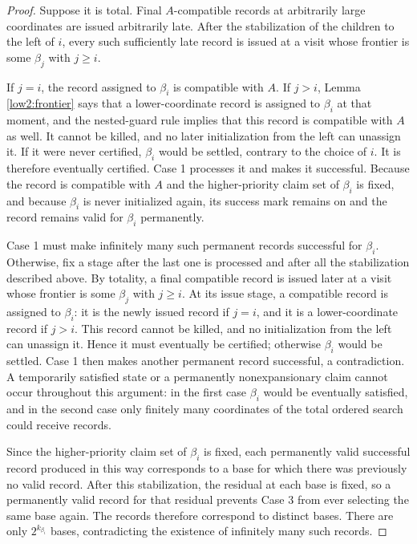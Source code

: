 \documentclass[11pt]{amsart}
\begin{document}
\begin{proof}
Suppose it is total. Final $A$-compatible records at arbitrarily large
coordinates are issued arbitrarily late. After the stabilization of the
children to the left of $i$, every such sufficiently late record is issued at
a visit whose frontier is some $\beta_j$ with $j\geq i$.

If $j=i$, the record assigned to $\beta_i$ is compatible with $A$. If $j>i$,
Lemma \ref{low2:frontier} says that a lower-coordinate record is assigned to
$\beta_i$ at that moment, and the nested-guard rule implies that this record
is compatible with $A$ as well. It cannot be killed, and no later
initialization from the left can unassign it. If it were never certified,
$\beta_i$ would be settled, contrary to the choice of $i$. It is therefore
eventually certified. Case 1 processes it and makes it successful.
Because the record is compatible with $A$ and the higher-priority claim set
of $\beta_i$ is fixed, and because $\beta_i$ is never initialized again, its
success mark remains on and the record remains valid for $\beta_i$
permanently.

Case 1 must make infinitely many such permanent records successful for
$\beta_i$. Otherwise, fix a stage after the last one is processed and after
all the stabilization described above. By totality, a final compatible record
is issued later at a visit whose frontier is some $\beta_j$ with $j\geq i$.
At its issue stage, a compatible record is assigned to $\beta_i$: it is the
newly issued record if $j=i$, and it is a lower-coordinate record if $j>i$.
This record cannot be killed, and no initialization from the left can unassign
it. Hence it must eventually be certified; otherwise $\beta_i$ would be
settled. Case 1 then makes another permanent record successful, a
contradiction. A temporarily satisfied state or a permanently
nonexpansionary claim cannot occur throughout this argument: in the first
case $\beta_i$ would be eventually satisfied, and in the second case only
finitely many coordinates of the total ordered search could receive records.

Since the higher-priority claim set of $\beta_i$ is fixed, each permanently
valid successful record produced in this way corresponds to a base for which
there was previously no valid record. After this stabilization, the residual
at each base is fixed, so a permanently valid record for that residual
prevents Case 3 from ever selecting the same base again. The records therefore
correspond to distinct bases. There are only $2^{k_{\beta_i}}$ bases,
contradicting the existence of infinitely many such records.
\end{proof}
\end{document}
